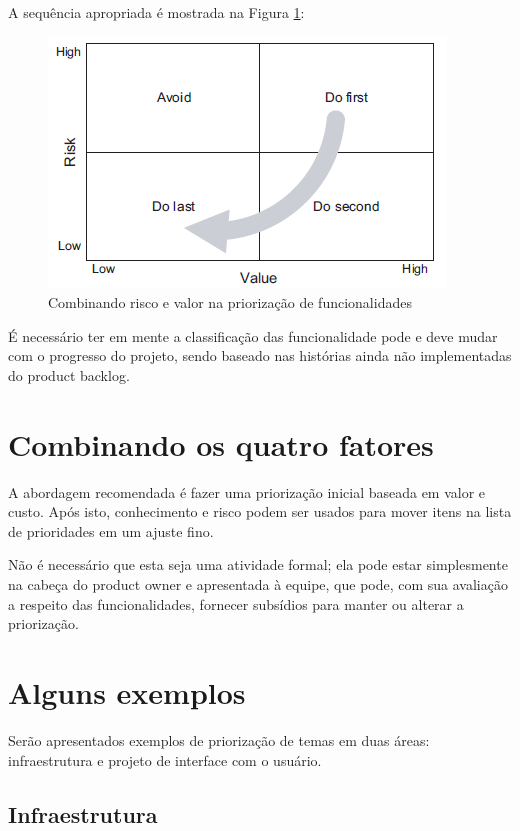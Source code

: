 \documentclass[a4paper,abntfigtabnum,noindentfirst]{abnt}
\begin{document}
A sequência apropriada é mostrada na Figura \ref{combinando-risco-e-valor}:

\begin{figure}
	\caption{Combinando risco e valor na priorização de funcionalidades}
	\label{combinando-risco-e-valor}
	\includegraphics[scale=0.8]{combinando-risco-e-valor}
\end{figure}


É necessário ter em mente a classificação das funcionalidade pode e deve mudar com o progresso do projeto, sendo baseado nas histórias ainda não implementadas do product backlog.


\section{Combinando os quatro fatores}

A abordagem recomendada é fazer uma priorização inicial baseada em valor e custo. Após isto, conhecimento e risco podem ser usados para mover itens na lista de prioridades em um ajuste fino.

Não é necessário que esta seja uma atividade formal; ela pode estar simplesmente na cabeça do product owner e apresentada à equipe, que pode, com sua avaliação a respeito das funcionalidades, fornecer subsídios para manter ou alterar a priorização.


\section{Alguns exemplos}

Serão apresentados exemplos de priorização de temas em duas áreas: infraestrutura e projeto de interface com o usuário.

\subsection{Infraestrutura}
\end{document}
